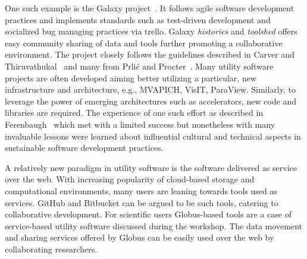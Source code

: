 \documentclass[11pt, oneside]{amsart}
\newcommand{\note}[1]{ {\textcolor{red}    { #1 }}}
\newcommand{\toolname}[1] {\textsf{#1}}
\begin{document}
One such example is the \toolname{Galaxy} project~\cite{Galaxy}. It
follows agile software development practices and implements standards
such as test-driven development and socialized bug managing practices
via \toolname{trello}. Galaxy \emph{histories} and \emph{toolshed}
offers easy community sharing of data and tools further promoting a
collaborative environment. The project closely follows the
guidelines described in Carver and Thiruvathukal~\cite{Carver_WSSSPE}
and many from Prli\'{c} and Procter~\cite{Prlic_WSSSPE}. Many utility
software projects are often developed aiming better utilizing a
particular, new infrastructure and architecture, e.g.,
\toolname{MVAPICH}, \toolname{VisIT}, \toolname{ParaView}. Similarly, to leverage the power
of emerging architectures such as accelerators, new code and libraries
are required. The experience of one such effort as described in
Ferenbaugh~\cite{Ferenbaugh_WSSSPE} which met with a limited success
but nonetheless with many invaluable lessons were learned about
influential cultural and technical aspects in sustainable software
development practices.

A relatively new paradigm in utility software is the software
delivered as service over the web. With increasing popularity of
cloud-based storage and computational environments, many users are
leaning towards tools used as services. \toolname{GitHub} and
\toolname{Bitbucket} can be argued to be such tools, catering to
collaborative development. For scientific users
\toolname{Globus}-based tools are a case of service-based utility
software discussed during the workshop. The data movement and sharing
services offered by \toolname{Globus} can be easily used over the web by
collaborating researchers.
\end{document}

